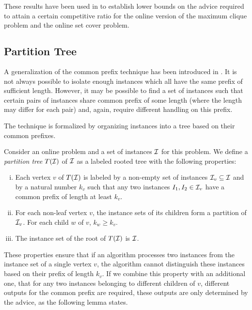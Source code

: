 These results have been used in \cite{string-guessing} to establish lower
bounds on the advice required to attain a certain competitive ratio for
the online version of the maximum clique problem and the online set cover
problem.

\subsection{Partition Tree}
\label{section:partition-tree}

A generalization of the common prefix technique has been introduced in
\cite{sofsem2014}. It is not always possible to isolate enough instances
which all have the same prefix of sufficient length. However, it may be
possible to find a set of instances such that certain pairs of instances
share common prefix of some length (where the length may differ for each
pair) and, again, require different handling on this prefix.

The technique is formalized by organizing instances into a tree based on
their common prefixes.

\begin{definition}\label{definition:partition-tree}
    Consider an online problem and a set of instances $\mathcal{I}$ for this problem.
    We define a \emph{partition tree} $T(\mathcal{I})$ of $\mathcal{I}$ as a labeled rooted
    tree with the following properties:
    \begin{enumerate}[(i)]
        \item Each vertex $v$ of $T(\mathcal{I})$ is labeled by a non-empty set of
            instances $\mathcal{I}_v \subseteq \mathcal{I}$ and by a natural number $k_v$
            such that any two instances $I_1, I_2 \in \mathcal{I}_v$ have a common
            prefix of length at least $k_v$.

        \item For each non-leaf vertex $v$, the instance sets of its
            children form a partition of $\mathcal{I}_v$. For each child $w$ of
            $v$, $k_w \geq k_v$.

        \item The instance set of the root of $T(\mathcal{I})$ is $\mathcal{I}$.
    \end{enumerate}
\end{definition}

These properties ensure that if an algorithm processes two instances from
the instance set of a single vertex $v$, the algorithm cannot distinguish
these instances based on their prefix of length $k_v$. If we combine this
property with an additional one, that for any two instances belonging to
different children of $v$, different outputs for the common prefix are
required, these outputs are only determined by the advice, as the
following lemma states.

